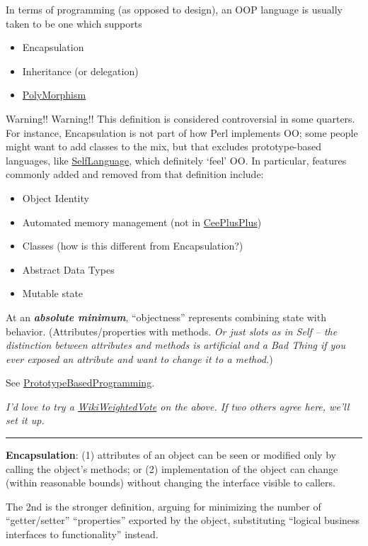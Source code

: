 \documentclass[10pt,twoside,openright]{memoir}
\begin{document}
In terms of programming (as opposed to design), an OOP language is usually taken to be one which supports
\begin{itemize}
\item Encapsulation
\item Inheritance (or delegation)
\item \ul{PolyMorphism}
\end{itemize}

Warning!! Warning!! This definition is considered controversial in some quarters. For instance, Encapsulation is not part of how Perl implements OO; some people might want to add classes to the mix, but that excludes prototype-based languages, like \ul{SelfLanguage}, which definitely `feel' OO. In particular, features commonly added and removed from that definition include:
\begin{itemize}
\item Object Identity
\item Automated memory management (not in \ul{CeePlusPlus})
\item Classes (how is this different from Encapsulation?)
\item Abstract Data Types
\item Mutable state
\end{itemize}

At an \textbf{\emph{absolute minimum}}, ``objectness'' represents combining state with behavior. (Attributes/properties with methods. \emph{Or just slots as in Self -- the distinction between attributes and methods is artificial and a Bad Thing if you ever exposed an attribute and want to change it to a method.})

See \ul{PrototypeBasedProgramming}.

\emph{I'd love to try a \ul{WikiWeightedVote} on the above. If two others agree here, we'll set it up.}

\vskip 0.1in

\hrule

\vskip 0.1in

\textbf{Encapsulation}: (1) attributes of an object can be seen or modified only by calling the object's methods; or (2) implementation of the object can change (within reasonable bounds) without changing the interface visible to callers.

The 2nd is the stronger definition, arguing for minimizing the number of ``getter/setter'' ``properties'' exported by the object, substituting ``logical business interfaces to functionality'' instead.
\end{document}
